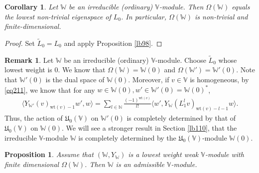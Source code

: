 \documentclass[12pt,b5paper,notitlepage]{report}
\theoremstyle{definition}
\newtheorem{rem}[df]{Remark}
\theoremstyle{plain}
\newtheorem{pp}[df]{Proposition}
\newtheorem{co}[df]{Corollary}
\newcommand{\fk}{\mathfrak}
\newcommand{\wtd}{\widetilde}
\newcommand{\bk}[1]{\langle {#1}\rangle}
\newcommand{\Vbb}{\mathbb V}
\newcommand{\Wbb}{\mathbb W}
\newcommand{\Nbb}{\mathbb N}
\newcommand{\wt}{\mathrm{wt}}
\numberwithin{equation}{section}
\begin{document}
\begin{co}\label{lb130}
Let $\Wbb$ be an irreducible (ordinary)  $\Vbb$-module. Then $\Omega(\Wbb)$ equals the lowest non-trivial eigenspace of $L_0$. In particular, $\Omega(\Wbb)$ is non-trivial and finite-dimensional.
\end{co}

\begin{proof}
Set $\wtd L_0=L_0$ and apply Proposition \ref{lb98}.
\end{proof}



\begin{rem}\label{lb111}
Let $\Wbb$ be an irreducible (ordinary) $\Vbb$-module. Choose $\wtd L_0$ whose lowest weight is $0$. We know that $\Omega(\Wbb)=\Wbb(0)$ and $\Omega(\Wbb')=\Wbb'(0)$. Note that $\Wbb'(0)$ is the dual space of $\Wbb(0)$. Moreover, if $v\in\Vbb$ is homogeneous,  by \eqref{eq211}, we know that for any $w\in\Wbb(0),w'\in\Wbb'(0)=\Wbb(0)^*$,
\begin{align}
\bk{Y_{\Wbb'}(v)_{\wt(v)-1}w',w}=\sum_{l\in\Nbb}\frac{(-1)^{\wt(v)}}{l!}\bk{w',Y_\Wbb(L_1^lv)_{\wt(v)-l-1}w}.\label{eq215}
\end{align}
Thus, the action of $\fk U_0(\Vbb)$ on $\Wbb'(0)$ is completely determined by that of $\fk U_0(\Vbb)$ on $\Wbb(0)$. We will see a stronger result in Section \ref{lb110}, that the irreducible $\Vbb$-module $\Wbb$ is completely determined by the $\fk U_0(\Vbb)$-module $\Wbb(0)$.
\end{rem}





\begin{pp}\label{lb97}
Assume that $(\Wbb,Y_\Wbb)$ is a lowest weight weak $\Vbb$-module with finite dimensional $\Omega(\Wbb)$. Then $\Wbb$ is an admissible $\Vbb$-module.
\end{pp}
\end{document}

